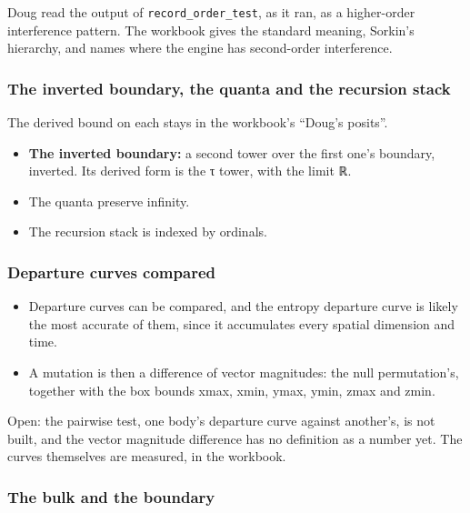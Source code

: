 Doug read the output of \texttt{record\_\allowbreak{}order\_\allowbreak{}test}, as it ran, as a higher-order interference pattern. The workbook gives the standard meaning, Sorkin's hierarchy, and names where the engine has second-order interference.

\subsubsection{\texorpdfstring{The inverted boundary, the quanta and the recursion stack}{The inverted boundary, the quanta and the recursion stack}}

The derived bound on each stays in the workbook's “Doug's posits”.

\begin{itemize}
\item \textbf{The inverted boundary:} a second tower over the first one's boundary, inverted. Its derived form is the τ tower, with the limit ℝ.
\item The quanta preserve infinity.
\item The recursion stack is indexed by ordinals.
\end{itemize}

\subsubsection{\texorpdfstring{Departure curves compared}{Departure curves compared}}

\begin{itemize}
\item Departure curves can be compared, and the entropy departure curve is likely the most accurate of them, since it accumulates every spatial dimension and time.
\item A mutation is then a difference of vector magnitudes: the null permutation's, together with the box bounds xmax, xmin, ymax, ymin, zmax and zmin.
\end{itemize}

Open: the pairwise test, one body's departure curve against another's, is not built, and the vector magnitude difference has no definition as a number yet. The curves themselves are measured, in the workbook.

\subsubsection{\texorpdfstring{The bulk and the boundary}{The bulk and the boundary}}

